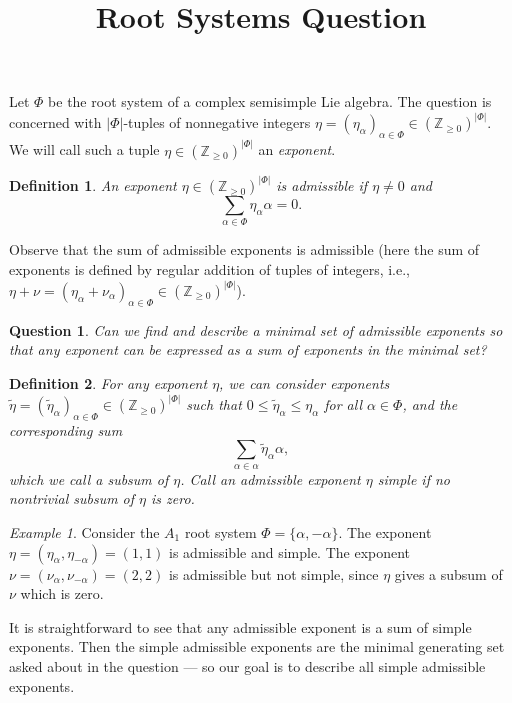 \documentclass[12pt]{amsart}
\title{Root Systems Question}
\newcommand{\Z}{\mathbb{Z}}
\newtheorem*{definition}{Definition}
\newtheorem*{question}{Question}
\theoremstyle{remark}
\theoremstyle{remark}
\newtheorem*{example}{Example}
\theoremstyle{remark}
\begin{document}
\maketitle

Let $\Phi$ be the root system of a complex semisimple Lie algebra.
The question is concerned with $|\Phi|$-tuples of nonnegative integers $\eta = (\eta_\alpha)_{\alpha\in\Phi} \in \left(\mathbb{Z}_{\ge 0}\right)^{|\Phi|}$.
We will call such a tuple $\eta \in \left(\mathbb{Z}_{\ge 0}\right)^{|\Phi|}$ an \emph{exponent}.

\begin{definition}
    An exponent $\eta \in (\Z_{\ge 0})^{|\Phi|}$ is \emph{admissible} if $\eta \ne 0$ and
    $$\sum_{\alpha \in \Phi} \eta_\alpha \alpha = 0.$$
\end{definition}

Observe that the sum of admissible exponents is admissible (here the sum of exponents is defined by regular addition of tuples of integers, i.e., $\eta+\nu = (\eta_\alpha+\nu_\alpha)_{\alpha\in\Phi}\in \left(\mathbb{Z}_{\ge 0}\right)^{|\Phi|}$).

\begin{question}
Can we find and describe a minimal set of admissible exponents so that any exponent can be expressed as a sum of exponents in the minimal set? 
\end{question}


\begin{definition}
For any exponent $\eta$, we can consider exponents $\tilde \eta = (\tilde \eta_\alpha)_{\alpha\in\Phi} \in (\Z_{\ge 0})^{|\Phi|}$ such that $0 \le \tilde \eta_\alpha \le \eta_\alpha$ for all $\alpha \in \Phi$, and the corresponding sum
$$\sum_{\alpha\in \alpha} \tilde \eta_\alpha \alpha,$$
which we call a \emph{subsum} of $\eta$.
Call an admissible exponent $\eta$ \emph{simple} if no nontrivial subsum of $\eta$ is zero.
\end{definition}

\begin{example}
    Consider the $A_1$ root system $\Phi=\{\alpha,-\alpha\}$.
    The exponent $\eta=(\eta_\alpha, \eta_{-\alpha}) = (1, 1)$ is admissible and simple.
    The exponent $\nu=(\nu_\alpha, \nu_{-\alpha}) = (2, 2)$ is admissible but not simple, since $\eta$ gives a subsum of $\nu$ which is zero.
\end{example}

It is straightforward to see that any admissible exponent is a sum of simple exponents.
Then the simple admissible exponents are the minimal generating set asked about in the question --- so our goal is to describe all simple admissible exponents.
\end{document}
